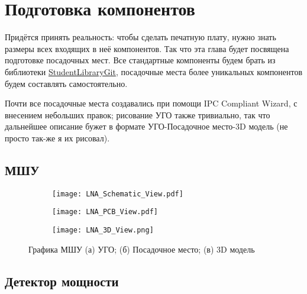 \chapter{Подготовка компонентов} \label{chap:altium-components}

Придётся принять реальность: чтобы сделать печатную плату, нужно знать размеры всех входящих в неё компонентов. Так что эта глава будет посвящена подготовке посадочных мест. 
Все стандартные компоненты будем брать из библиотеки \href{https://github.com/dee3mon/StudentsLibraryGIT}{StudentLibraryGit}, посадочные места более уникальных компонентов будем составлять самостоятельно. 

Почти все посадочные места создавались при помощи IPC Compliant Wizard, с внесением небольших правок; рисование УГО также тривиально, так что дальнейшее описание бужет в формате УГО-Посадочное место-3D модель (не просто так-же я их рисовал).

\section{МШУ}

\begin{figure}[H]
	\centering
	\begin{subfigure}[b]{0.45\textwidth}
		\centering
		\texttt{[image: LNA\_Schematic\_View.pdf]}
		\caption{}%
		\label{fig:LNA_Schematic_View}
	\end{subfigure}
	\hfill
	\begin{subfigure}[b]{0.45\textwidth}
		\centering
		\texttt{[image: LNA\_PCB\_View.pdf]}
		\caption{}%
		\label{fig:LNA_PCB_View}
	\end{subfigure}
	\hfill
	\begin{subfigure}[b]{0.5\textwidth}
		\centering
		\texttt{[image: LNA\_3D\_View.png]}
		\caption{}%
		\label{fig:LNA_3D_View}
	\end{subfigure}
	\caption{%
		Графика МШУ
		(а) УГО;
		(б) Посадочное место;
		(в) 3D модель
	}%
	\label{fig:LNA_footprint}
\end{figure}

\section{Детектор мощности}

